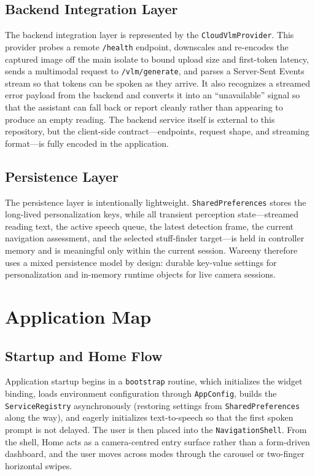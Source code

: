 \documentclass[12pt,a4paper]{report}
\begin{document}
\subsection{Backend Integration Layer}
The backend integration layer is represented by the \texttt{CloudVlmProvider}. This provider probes a remote \texttt{/health} endpoint, downscales and re-encodes the captured image off the main isolate to bound upload size and first-token latency, sends a multimodal request to \texttt{/vlm/generate}, and parses a Server-Sent Events stream so that tokens can be spoken as they arrive. It also recognizes a streamed error payload from the backend and converts it into an ``unavailable'' signal so that the assistant can fall back or report cleanly rather than appearing to produce an empty reading. The backend service itself is external to this repository, but the client-side contract---endpoints, request shape, and streaming format---is fully encoded in the application.

\subsection{Persistence Layer}
The persistence layer is intentionally lightweight. \texttt{SharedPreferences} stores the long-lived personalization keys, while all transient perception state---streamed reading text, the active speech queue, the latest detection frame, the current navigation assessment, and the selected stuff-finder target---is held in controller memory and is meaningful only within the current session. Wareeny therefore uses a mixed persistence model by design: durable key-value settings for personalization and in-memory runtime objects for live camera sessions.

\section{Application Map}
\subsection{Startup and Home Flow}
Application startup begins in a \texttt{bootstrap} routine, which initializes the widget binding, loads environment configuration through \texttt{AppConfig}, builds the \texttt{ServiceRegistry} asynchronously (restoring settings from \texttt{SharedPreferences} along the way), and eagerly initializes text-to-speech so that the first spoken prompt is not delayed. The user is then placed into the \texttt{NavigationShell}. From the shell, Home acts as a camera-centred entry surface rather than a form-driven dashboard, and the user moves across modes through the carousel or two-finger horizontal swipes.
\end{document}
